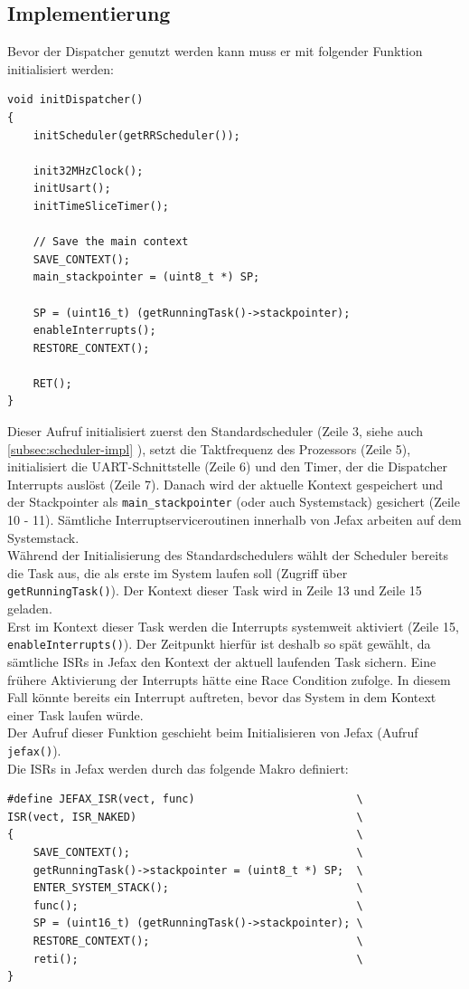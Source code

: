 \documentclass[fontsize=12pt, toc=bibliography, notitlepage]{scrreprt}
\newcommand{\refnn}[1]{\ref{#1} \nameref{#1}}
\begin{document}
\subsection{Implementierung}
\label{subsec:dispatcher-impl}
Bevor der Dispatcher genutzt werden kann muss er mit folgender Funktion initialisiert werden:

\begin{lstlisting}[title=dispatcher.c]
void initDispatcher()
{
	initScheduler(getRRScheduler());
	
	init32MHzClock();
	initUsart();
	initTimeSliceTimer();
	
	// Save the main context
	SAVE_CONTEXT();
	main_stackpointer = (uint8_t *) SP;
	
	SP = (uint16_t) (getRunningTask()->stackpointer);
	enableInterrupts();
	RESTORE_CONTEXT();
	
	RET();
}
\end{lstlisting}

Dieser Aufruf initialisiert zuerst den Standardscheduler (Zeile 3, siehe auch \refnn{subsec:scheduler-impl}), setzt die Taktfrequenz des Prozessors (Zeile 5), initialisiert die UART-Schnittstelle (Zeile 6) und den Timer, der die Dispatcher Interrupts auslöst (Zeile 7). Danach wird der aktuelle Kontext gespeichert und der Stackpointer als \lstinline$main_stackpointer$ (oder auch Systemstack) gesichert (Zeile 10 - 11). Sämtliche Interruptserviceroutinen innerhalb von Jefax arbeiten auf dem Systemstack.\\
Während der Initialisierung des Standardschedulers wählt der Scheduler bereits die Task aus, die als erste im System laufen soll (Zugriff über \lstinline$getRunningTask()$). Der Kontext dieser Task wird in Zeile 13 und Zeile 15 geladen.\\
Erst im Kontext dieser Task werden die Interrupts systemweit aktiviert (Zeile 15, \lstinline$enableInterrupts()$). Der Zeitpunkt hierfür ist deshalb so spät gewählt, da sämtliche ISRs in Jefax den Kontext der aktuell laufenden Task sichern. Eine frühere Aktivierung der Interrupts hätte eine Race Condition zufolge. In diesem Fall könnte bereits ein Interrupt auftreten, bevor das System in dem Kontext einer Task laufen würde.\\
Der Aufruf dieser Funktion geschieht beim Initialisieren von Jefax (Aufruf \lstinline$jefax()$).\\
Die ISRs in Jefax werden durch das folgende Makro definiert:

\begin{lstlisting}[title=interrupt.h]
#define JEFAX_ISR(vect, func)                         \
ISR(vect, ISR_NAKED)                                  \
{                                                     \
	SAVE_CONTEXT();                                   \
	getRunningTask()->stackpointer = (uint8_t *) SP;  \
	ENTER_SYSTEM_STACK();                             \
	func();                                           \
	SP = (uint16_t) (getRunningTask()->stackpointer); \
	RESTORE_CONTEXT();                                \
	reti();                                           \
}
\end{lstlisting}
\end{document}
